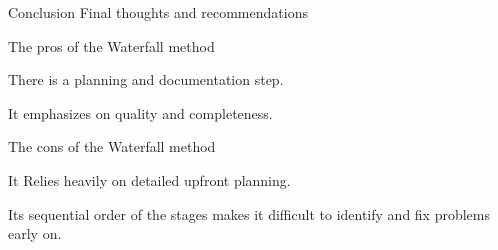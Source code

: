 \begin{frame}{Conclusion}
Final thoughts and recommendations
    \begin{alertblock}{The pros of the Waterfall method}
        \item There is a planning and documentation step.
        
        \item It emphasizes on quality and completeness.
    \end{alertblock}

    \begin{alertblock}{The cons of the Waterfall method}
        \item It Relies heavily on detailed upfront planning.
               
        \item Its sequential order of the stages makes it difficult to identify and fix problems early on.
    \end{alertblock}
\end{frame}